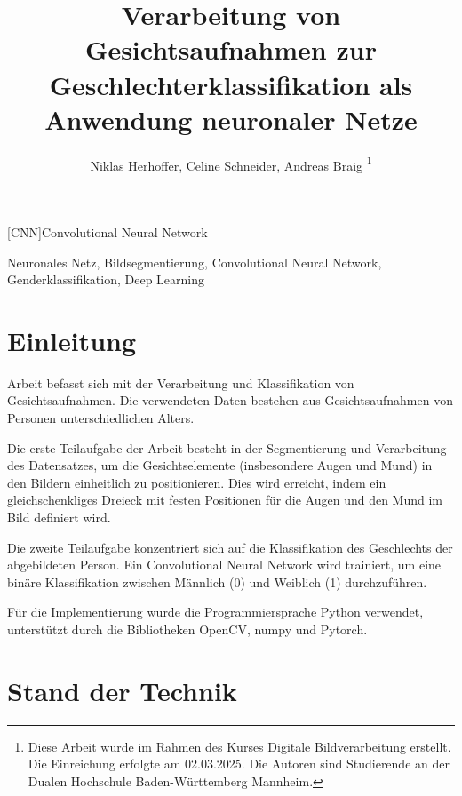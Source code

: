 \documentclass[journal,twoside,web]{ieeecolor}
\begin{document}
\begin{acronym}
    [CNN]{Convolutional Neural Network} 
\end{acronym}

\title{Verarbeitung von Gesichtsaufnahmen zur Geschlechterklassifikation als Anwendung neuronaler Netze}
\author{Niklas Herhoffer, Celine Schneider, Andreas Braig
\thanks{Diese Arbeit wurde im Rahmen des Kurses Digitale Bildverarbeitung erstellt. Die Einreichung erfolgte am 02.03.2025. Die Autoren sind Studierende an der Dualen Hochschule Baden-Württemberg Mannheim.}
}


\maketitle

    


\begin{IEEEkeywords}
    Neuronales Netz, Bildsegmentierung, Convolutional Neural Network, Genderklassifikation, Deep Learning
\end{IEEEkeywords}

\section{Einleitung}
\label{sec:introduction}
 Arbeit befasst sich mit der Verarbeitung und Klassifikation von Gesichtsaufnahmen. Die verwendeten Daten bestehen aus Gesichtsaufnahmen von Personen unterschiedlichen Alters. 

Die erste Teilaufgabe der Arbeit besteht in der Segmentierung und Verarbeitung des Datensatzes, um die Gesichtselemente (insbesondere Augen und Mund) in den Bildern einheitlich zu positionieren. Dies wird erreicht, indem ein gleichschenkliges Dreieck mit festen Positionen für die Augen und den Mund im Bild definiert wird. 

Die zweite Teilaufgabe konzentriert sich auf die Klassifikation des Geschlechts der abgebildeten Person. Ein Convolutional Neural Network wird trainiert, um eine binäre Klassifikation zwischen Männlich (0) und Weiblich (1) durchzuführen.

Für die Implementierung wurde die Programmiersprache Python verwendet, unterstützt durch die Bibliotheken OpenCV, numpy und Pytorch.

\section{Stand der Technik}
\label{sec:state_of_the_art}
\end{document}
